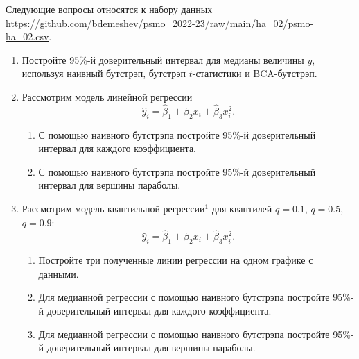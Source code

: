 \documentclass[12pt]{article}
\begin{document}
Следующие вопросы относятся к набору данных \url{https://github.com/bdemeshev/psmo_2022-23/raw/main/ha_02/psmo-ha_02.csv}. 

\begin{enumerate}[resume]
    \item Постройте 95\%-й доверительный интервал для медианы величины $y$, используя наивный бутстрэп, бутстрэп $t$-статистики и BCA-бутстрэп. 

    \item Рассмотрим модель линейной регрессии 
    \[
    \hat y_i = \hat \beta_1 + \hat\beta_2 x_i + \hat\beta_3 x_i^2.
    \]
    \begin{enumerate}
    \item С помощью наивного бутстрэпа постройте 95\%-й доверительный интервал для каждого коэффициента.
    \item С помощью наивного бутстрэпа постройте 95\%-й доверительный интервал для вершины параболы. 
    \end{enumerate}
\item Рассмотрим модель квантильной регрессии$^1$ для квантилей $q=0.1$, $q=0.5$, $q=0.9$:
    \[
    \hat y_i = \hat \beta_1 + \hat\beta_2 x_i + \hat\beta_3 x_i^2.
    \]
    \begin{enumerate}
    \item Постройте три полученные линии регрессии на одном графике с данными. 
    \item Для медианной регрессии с помощью наивного бутстрэпа постройте 95\%-й доверительный интервал для каждого коэффициента.
    \item Для медианной регрессии с помощью наивного бутстрэпа постройте 95\%-й доверительный интервал для вершины параболы. 
    \end{enumerate}


\end{enumerate}
\end{document}
